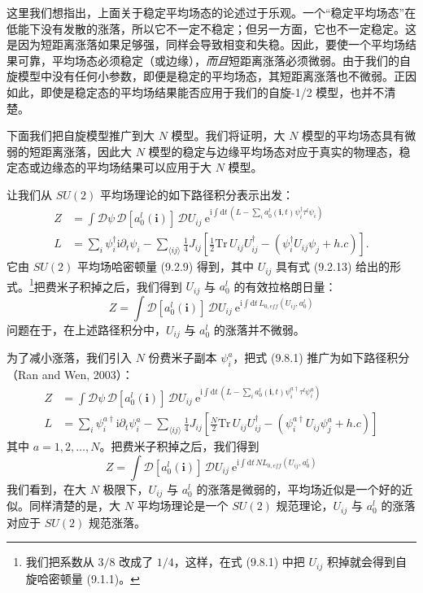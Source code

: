 这里我们想指出，上面关于稳定平均场态的论述过于乐观。一个“稳定平均场态”在低能下没有发散的涨落，所以它不一定不稳定；但另一方面，它也不一定稳定。这是因为短距离涨落如果足够强，同样会导致相变和失稳。因此，要使一个平均场结果可靠，平均场态必须稳定（或边缘），\emph{而且}短距离涨落必须微弱。由于我们的自旋模型中没有任何小参数，即便是稳定的平均场态，其短距离涨落也不微弱。正因如此，即使是稳定态的平均场结果能否应用于我们的自旋-1/2 模型，也并不清楚。

下面我们把自旋模型推广到大 $N$ 模型。我们将证明，大 $N$ 模型的平均场态具有微弱的短距离涨落，因此大 $N$ 模型的稳定与边缘平均场态对应于真实的物理态，稳定态或边缘态的平均场结果可以应用于大 $N$ 模型。

让我们从 $SU(2)$ 平均场理论的如下路径积分表示出发：
\begin{equation*}
\begin{aligned}
Z &= \int \mathcal{D}\psi\,\mathcal{D}[a_0^l(\pmb{i})]\,\mathcal{D}U_{ij}\ \mathrm{e}^{\mathrm{i}\int\mathrm{d}t\,(L-\sum_i a_0^l(\pmb{i},t)\psi_i^{\dagger}\tau^{l}\psi_i)} \\
L &= \sum_i \psi_i^{\dagger}\mathrm{i}\partial_t\psi_i-\sum_{\langle ij\rangle}\frac{1}{4}J_{ij}\left[\frac{1}{2}\mathrm{Tr}\,U_{ij}U_{ij}^{\dagger}-(\psi_i^{\dagger}U_{ij}\psi_j+h.c)\right].
\end{aligned}
\tag{9.8.1}
\end{equation*}
它由 $SU(2)$ 平均场哈密顿量 (9.2.9) 得到，其中 $U_{ij}$ 具有式 (9.2.13) 给出的形式。\footnote{我们把系数从 $3/8$ 改成了 $1/4$，这样，在式 (9.8.1) 中把 $U_{ij}$ 积掉就会得到自旋哈密顿量 (9.1.1)。}把费米子积掉之后，我们得到 $U_{ij}$ 与 $a_0^l$ 的有效拉格朗日量：
\begin{equation*}
Z=\int \mathcal{D}[a_0^l(\pmb{i})]\,\mathcal{D}U_{ij}\ \mathrm{e}^{\mathrm{i}\int\mathrm{d}t\,L_{0,eff}(U_{ij},a_0^l)}
\end{equation*}
问题在于，在上述路径积分中，$U_{ij}$ 与 $a_0^l$ 的涨落并不微弱。

为了减小涨落，我们引入 $N$ 份费米子副本 $\psi_i^a$，把式 (9.8.1) 推广为如下路径积分（Ran and Wen, 2003）：
\begin{equation*}
\begin{aligned}
Z &= \int \mathcal{D}\psi\,\mathcal{D}[a_0^l(\pmb{i})]\,\mathcal{D}U_{ij}\ \mathrm{e}^{\mathrm{i}\int\mathrm{d}t\,(L-\sum_i a_0^l(\pmb{i},t)\psi_i^{a\dagger}\tau^{l}\psi_i^{a})} \\
L &= \sum_i \psi_i^{a\dagger}\mathrm{i}\partial_t\psi_i^{a}-\sum_{\langle ij\rangle}\frac{1}{4}J_{ij}\left[\frac{N}{2}\mathrm{Tr}\,U_{ij}U_{ij}^{\dagger}-(\psi_i^{a\dagger}U_{ij}\psi_j^{a}+h.c)\right]
\end{aligned}
\tag{9.8.2}
\end{equation*}
其中 $a=1,2,\dots,N$。把费米子积掉之后，我们得到
\begin{equation*}
Z=\int \mathcal{D}[a_0^l(\pmb{i})]\,\mathcal{D}U_{ij}\ \mathrm{e}^{\mathrm{i}\int\mathrm{d}t\,N L_{0,eff}(U_{ij},a_0^l)}
\end{equation*}
我们看到，在大 $N$ 极限下，$U_{ij}$ 与 $a_0^l$ 的涨落是微弱的，平均场近似是一个好的近似。同样清楚的是，大 $N$ 平均场理论是一个 $SU(2)$ 规范理论，$U_{ij}$ 与 $a_0^l$ 的涨落对应于 $SU(2)$ 规范涨落。

